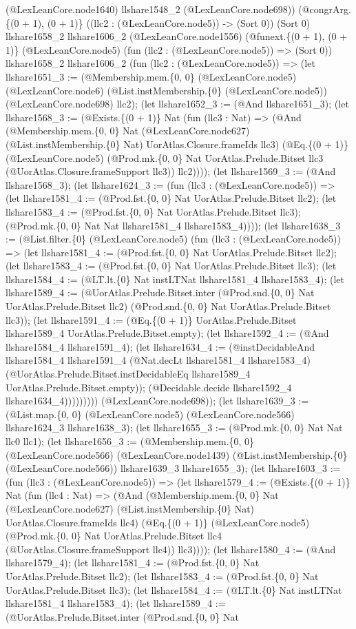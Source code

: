 \documentclass[11pt]{article}
\begin{document}
(@LexLeanCore.node1640) llshare1548\_2 (@LexLeanCore.node698)) (@congrArg.\{(0 + 1), (0 + 1)\} ((llc2 : (@LexLeanCore.node5)) -> (Sort 0)) (Sort 0) llshare1658\_2 llshare1606\_2 (@LexLeanCore.node1556) (@funext.\{(0 + 1), (0 + 1)\} (@LexLeanCore.node5) (fun (llc2 : (@LexLeanCore.node5)) => (Sort 0)) llshare1658\_2 llshare1606\_2 (fun (llc2 : (@LexLeanCore.node5)) => (let llshare1651\_3 := (@Membership.mem.\{0, 0\} (@LexLeanCore.node5) (@LexLeanCore.node6) (@List.instMembership.\{0\} (@LexLeanCore.node5)) (@LexLeanCore.node698) llc2); (let llshare1652\_3 := (@And llshare1651\_3); (let llshare1568\_3 := (@Exists.\{(0 + 1)\} Nat (fun (llc3 : Nat) => (@And (@Membership.mem.\{0, 0\} Nat (@LexLeanCore.node627) (@List.instMembership.\{0\} Nat) UorAtlas.Closure.frameIds llc3) (@Eq.\{(0 + 1)\} (@LexLeanCore.node5) (@Prod.mk.\{0, 0\} Nat UorAtlas.Prelude.Bitset llc3 (@UorAtlas.Closure.frameSupport llc3)) llc2)))); (let llshare1569\_3 := (@And llshare1568\_3); (let llshare1624\_3 := (fun (llc3 : (@LexLeanCore.node5)) => (let llshare1581\_4 := (@Prod.fst.\{0, 0\} Nat UorAtlas.Prelude.Bitset llc2); (let llshare1583\_4 := (@Prod.fst.\{0, 0\} Nat UorAtlas.Prelude.Bitset llc3); (@Prod.mk.\{0, 0\} Nat Nat llshare1581\_4 llshare1583\_4)))); (let llshare1638\_3 := (@List.filter.\{0\} (@LexLeanCore.node5) (fun (llc3 : (@LexLeanCore.node5)) => (let llshare1581\_4 := (@Prod.fst.\{0, 0\} Nat UorAtlas.Prelude.Bitset llc2); (let llshare1583\_4 := (@Prod.fst.\{0, 0\} Nat UorAtlas.Prelude.Bitset llc3); (let llshare1584\_4 := (@LT.lt.\{0\} Nat instLTNat llshare1581\_4 llshare1583\_4); (let llshare1589\_4 := (@UorAtlas.Prelude.Bitset.inter (@Prod.snd.\{0, 0\} Nat UorAtlas.Prelude.Bitset llc2) (@Prod.snd.\{0, 0\} Nat UorAtlas.Prelude.Bitset llc3)); (let llshare1591\_4 := (@Eq.\{(0 + 1)\} UorAtlas.Prelude.Bitset llshare1589\_4 UorAtlas.Prelude.Bitset.empty); (let llshare1592\_4 := (@And llshare1584\_4 llshare1591\_4); (let llshare1634\_4 := (@instDecidableAnd llshare1584\_4 llshare1591\_4 (@Nat.decLt llshare1581\_4 llshare1583\_4) (@UorAtlas.Prelude.Bitset.instDecidableEq llshare1589\_4 UorAtlas.Prelude.Bitset.empty)); (@Decidable.decide llshare1592\_4 llshare1634\_4))))))))) (@LexLeanCore.node698)); (let llshare1639\_3 := (@List.map.\{0, 0\} (@LexLeanCore.node5) (@LexLeanCore.node566) llshare1624\_3 llshare1638\_3); (let llshare1655\_3 := (@Prod.mk.\{0, 0\} Nat Nat llc0 llc1); (let llshare1656\_3 := (@Membership.mem.\{0, 0\} (@LexLeanCore.node566) (@LexLeanCore.node1439) (@List.instMembership.\{0\} (@LexLeanCore.node566)) llshare1639\_3 llshare1655\_3); (let llshare1603\_3 := (fun (llc3 : (@LexLeanCore.node5)) => (let llshare1579\_4 := (@Exists.\{(0 + 1)\} Nat (fun (llc4 : Nat) => (@And (@Membership.mem.\{0, 0\} Nat (@LexLeanCore.node627) (@List.instMembership.\{0\} Nat) UorAtlas.Closure.frameIds llc4) (@Eq.\{(0 + 1)\} (@LexLeanCore.node5) (@Prod.mk.\{0, 0\} Nat UorAtlas.Prelude.Bitset llc4 (@UorAtlas.Closure.frameSupport llc4)) llc3)))); (let llshare1580\_4 := (@And llshare1579\_4); (let llshare1581\_4 := (@Prod.fst.\{0, 0\} Nat UorAtlas.Prelude.Bitset llc2); (let llshare1583\_4 := (@Prod.fst.\{0, 0\} Nat UorAtlas.Prelude.Bitset llc3); (let llshare1584\_4 := (@LT.lt.\{0\} Nat instLTNat llshare1581\_4 llshare1583\_4); (let llshare1589\_4 := (@UorAtlas.Prelude.Bitset.inter (@Prod.snd.\{0, 0\} Nat 
\end{document}
